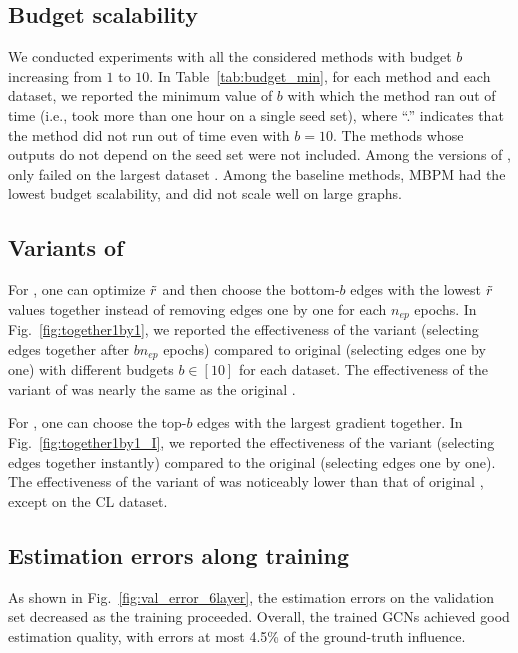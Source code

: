 \subsection{Budget scalability}\label{app:scal} 
We conducted experiments with all the considered methods with budget $b$ increasing from $1$ to $10$.
In Table~\ref{tab:budget_min}, for each method and each dataset, we reported the minimum value of $b$ with which the method ran out of time (i.e., took more than one hour on a single seed set), where ``.''  indicates that the method did not run out of time even with $b = 10$.
The methods whose outputs do not depend on the seed set were not included.
Among the versions of \method, only \naive failed on the largest dataset \WL.
Among the baseline methods, MBPM had the lowest budget scalability, and \Greedy did not scale well on large graphs.

\subsection{Variants of \method}\label{app:together1by1} 
For \adv, one can optimize $\Tilde{r}$ and then choose the bottom-$b$ edges with the lowest $\Tilde{r}$ values together instead of removing edges one by one for each $n_{ep}$ epochs.
In Fig.~\ref{fig:together1by1}, we reported the effectiveness of the variant (selecting edges together after $bn_{ep}$ epochs) compared to original \adv (selecting edges one by one) with different budgets $b\in [10]$ for each dataset.
The effectiveness of the variant of \adv was nearly the same as the original \adv.

For \advp, one can choose the top-$b$ edges with the largest gradient together.
In Fig.~\ref{fig:together1by1_I}, we reported the effectiveness of the variant (selecting edges together instantly) compared to the original \advp (selecting edges one by one).
The effectiveness of the variant of \advp was noticeably lower than that of original \advp, except on the CL dataset.

\subsection{Estimation errors along training}\label{app:estim_error}
As shown in Fig.~\ref{fig:val_error_6layer}, the estimation errors on the validation set decreased as the training proceeded.
Overall, the trained GCNs achieved good estimation quality, with errors at most 4.5\% of the ground-truth influence.




